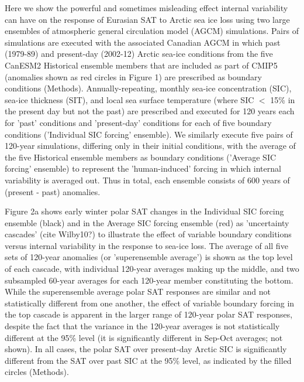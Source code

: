 \documentclass[grl]{AGUTeX}  %
\begin{document}
\begin{article}
Here we show the powerful and sometimes misleading effect internal variability can have on the response of Eurasian SAT to Arctic sea ice loss using two large ensembles of atmospheric general circulation model (AGCM) simulations. Pairs of simulations are executed with the associated Canadian AGCM in which past (1979-89) and present-day (2002-12) Arctic sea-ice conditions from the five CanESM2 Historical ensemble members that are included as part of CMIP5 (anomalies shown as red circles in Figure 1) are prescribed as boundary conditions (Methods). Annually-repeating, monthly sea-ice concentration (SIC), sea-ice thickness (SIT), and local sea surface temperature (where SIC $<$ 15\% in the present day but not the past) are prescribed and executed for 120 years each for 'past' conditions and 'present-day' conditions for each of five boundary conditions ('Individual SIC forcing' ensemble). We similarly execute five pairs of 120-year simulations, differing only in their initial conditions, with the average of the five Historical ensemble members as boundary conditions ('Average SIC forcing' ensemble) to represent the 'human-induced' forcing in which internal variability is averaged out. Thus in total, each ensemble consists of 600 years of (present - past) anomalies.

Figure 2a shows early winter polar SAT changes in the Individual SIC forcing ensemble (black) and in the Average SIC forcing ensemble (red) as 'uncertainty cascades' (cite Wilby10?) to illustrate the effect of variable boundary conditions versus internal variability in the response to sea-ice loss. The average of all five sets of 120-year anomalies (or 'superensemble average') is shown as the top level of each cascade, with individual 120-year averages making up the middle, and two subsampled 60-year averages for each 120-year member constituting the bottom. While the superensemble average polar SAT responses are similar and not statistically different from one another, the effect of variable boundary forcing in the top cascade is apparent in the larger range of 120-year polar SAT responses, despite the fact that the variance in the 120-year averages is not statistically different at the 95\% level (it is significantly different in Sep-Oct averages; not shown). In all cases, the polar SAT over present-day Arctic SIC is significantly different from the SAT over past SIC at the 95\% level, as indicated by the filled circles (Methods). %


\end{article}
\end{document}
